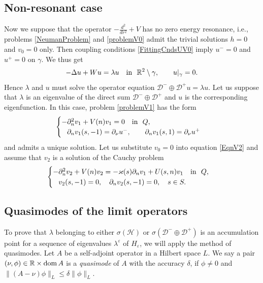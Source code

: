 \documentclass[reqno]{amsart}
\theoremstyle{plain}
\numberwithin{equation}{section}
\newcommand{\dom}{\mathop{\rm dom}}
\renewcommand{\kappa}{\varkappa}
\newcommand{\Real}{\mathbb R}
\newcommand{\eps}{\varepsilon}
\newcommand{\cH}{\mathcal{H}}
\renewcommand{\leq}{\leqslant}
\newcommand{\pte}{\partial_n}
\begin{document}
\subsection{Non-resonant case}
Now we suppose that the operator $-\frac{d^2}{dr^2}+V$ has no zero energy resonance, i.e.,  problems \eqref{NeumanProblem} and \eqref{problemV0} admit the trivial solutions $h=0$ and $v_0=0$ only.  Then coupling conditions \eqref{FittingCndsUV0} imply $u^-=0$ and $u^+=0$ on $\gamma$. We thus get
\begin{equation*}
-\Delta u+Wu=\lambda u\quad \hbox{in \ } \Real^2\setminus \gamma,\qquad
 u|_{\gamma}=0.
\end{equation*}
Hence $\lambda$ and $u$ must solve the operator equation  $\mathcal{D}^-\oplus\mathcal{D}^+u=\lambda u$.
Let us suppose that $\lambda$ is an eigenvalue of the direct sum
$\mathcal{D}^-\oplus\mathcal{D}^+$ and $u$ is the corresponding eigenfunction.
In this case, problem \eqref{problemV1} has the form
\begin{equation}\label{problemV1Non}
\begin{cases}
    -\pte^2 v_1+V(n)v_1=0\quad \hbox{in \ } Q, \\
    \phantom{-}\partial_n v_1(s, -1)=\partial_\nu u^-, \qquad
\partial_n v_1(s, 1)=\partial_\nu u^+
\end{cases}
\end{equation}
and admits a unique solution. Let us substitute $v_0=0$ into equation \eqref{EqnV2} and assume that $v_2$ is a solution of the Cauchy problem
\begin{equation*}
\begin{cases}
-\pte^2 v_2+V(n)v_2=-\kappa(s)\pte v_1 +U(s,n) v_1
  \quad \hbox{in \ } Q,
\\
   \phantom{-} v_2(s, -1)=0,
 \quad
 \partial_n v_2(s, -1)=0, \quad s\in S.
\end{cases}
\end{equation*}





\subsection{Quasimodes of the limit operators}
To prove that $\lambda$ belonging to either $\sigma(\cH)$ or $\sigma(\mathcal{D}^-\oplus\mathcal{D}^+)$ is an accumulation point for a sequence of eigenvalues $\lambda^\eps$ of $H_\eps$, we will apply the method of quasimodes.
Let $A$ be a self-adjoint operator in a Hilbert space $L$.
We say a pair $(\nu, \phi)\in \Real\times \dom A$ is a \textit{quasimode} of  $A$ with the accuracy $\delta$, if $\phi\neq 0$  and
$\|(A-\nu)\phi\|_L\leq\delta\|\phi\|_L$.
\end{document}

